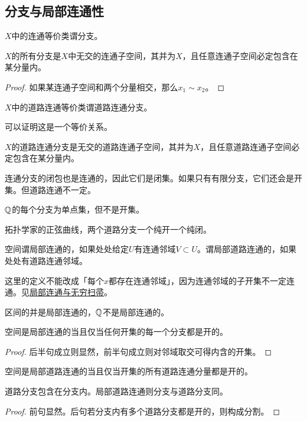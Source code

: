 \documentclass{ctexrep}
\begin{document}
  \subsection{分支与局部连通性}
  \begin{definition}
    $X$中的连通等价类谓分支。
  \end{definition}
  \begin{theorem}
    $X$的所有分支是$X$中无交的连通子空间，其并为$X$，且任意连通子空间必定包含在某分量内。
  \end{theorem}
  \begin{proof}
    如果某连通子空间和两个分量相交，那么$x_1\sim x_2$。
  \end{proof}
  \begin{definition}
    $X$中的道路连通等价类谓道路连通分支。
  \end{definition}
  可以证明这是一个等价关系。
  \begin{theorem}
    $X$的道路连通分支是无交的道路连通子空间，其并为$X$，且任意道路连通子空间必定包含在某分量内。
  \end{theorem}
  连通分支的闭包也是连通的，因此它们是闭集。如果只有有限分支，它们还会是开集。但道路连通不一定。
  \begin{ex}
    $\mathbb{Q}$的每个分支为单点集，但不是开集。
  \end{ex}
  \begin{ex}
    拓扑学家的正弦曲线，两个道路分支一个纯开一个纯闭。
  \end{ex}
  \begin{definition}
    空间谓局部连通的，如果处处给定$U$有连通邻域$V\subset U$。谓局部道路连通的，如果处处有道路连通邻域。
  \end{definition}
  \begin{ex}
    这里的定义不能改成「每个$x$都存在连通邻域」，因为连通邻域的子开集不一定连通。见\href{https://math.stackexchange.com/questions/2439096/consider-the-infinite-broom}{局部连通与无穷扫帚}。
  \end{ex}
  \begin{ex}
    区间的并是局部连通的，$\mathbb{Q}$不是局部连通的。
  \end{ex}
  \begin{theorem}
    空间是局部连通的当且仅当任何开集的每一个分支都是开的。
  \end{theorem}
  \begin{proof}
    后半句成立则显然，前半句成立则对邻域取交可得内含的开集。
  \end{proof}
  \begin{theorem}
    空间是局部道路连通的当且仅当开集的所有道路连通分量都是开的。
  \end{theorem}
  \begin{theorem}
    道路分支包含在分支内。局部道路连通则分支与道路分支同。
  \end{theorem}
  \begin{proof}
    前句显然。后句若分支内有多个道路分支都是开的，则构成分割。
  \end{proof}
\end{document}
